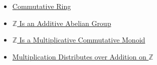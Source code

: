 \begin{dependencies}
\begin{itemize}
  \item \hyperref[def:commutative-ring]{Commutative Ring}
  \item \hyperref[thm:z-additive-abelian-group]{$\mathbb{Z}$ Is an Additive Abelian Group}
  \item \hyperref[thm:z-multiplicative-commutative-monoid]{$\mathbb{Z}$ Is a Multiplicative Commutative Monoid}
  \item \hyperref[thm:multiplication-distributes-over-addition-on-z]{Multiplication Distributes over Addition on $\mathbb{Z}$}
\end{itemize}
\end{dependencies}
